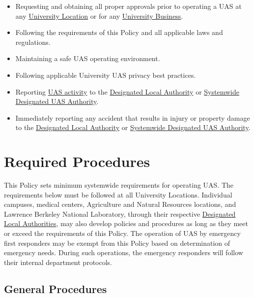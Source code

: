 \documentclass[
]{book}
\providecommand{\tightlist}{%
  \setlength{\itemsep}{0pt}\setlength{\parskip}{0pt}}
\begin{document}
\begin{itemize}
\tightlist
\item
  Requesting and obtaining all proper approvals prior to operating a UAS at any \protect\hyperlink{UL}{University Location} or for any \protect\hyperlink{UB}{University Business}.
\item
  Following the requirements of this Policy and all applicable laws and regulations.
\item
  Maintaining a safe UAS operating environment.
\item
  Following applicable University UAS privacy best practices.
\item
  Reporting \protect\hyperlink{UASactivity}{UAS activity} to the \protect\hyperlink{DLA}{Designated Local Authority} or \protect\hyperlink{SDA}{Systemwide Designated UAS Authority}.
\item
  Immediately reporting any accident that results in injury or property damage to the \protect\hyperlink{DLA}{Designated Local Authority} or \protect\hyperlink{SDA}{Systemwide Designated UAS Authority}.
\end{itemize}

\hypertarget{required-procedures}{%
\section{Required Procedures}\label{required-procedures}}

This Policy sets minimum systemwide requirements for operating UAS. The requirements below must be followed at all University Locations. Individual campuses, medical centers, Agriculture and Natural Resources locations, and Lawrence Berkeley National Laboratory, through their respective \protect\hyperlink{DLA}{Designated Local Authorities}, may also develop policies and procedures as long as they meet or exceed the requirements of this Policy.
The operation of UAS by emergency first responders may be exempt from this Policy based on determination of emergency needs. During such operations, the emergency responders will follow their internal department protocols.

\hypertarget{general-procedures}{%
\subsection{General Procedures}\label{general-procedures}}
\end{document}
